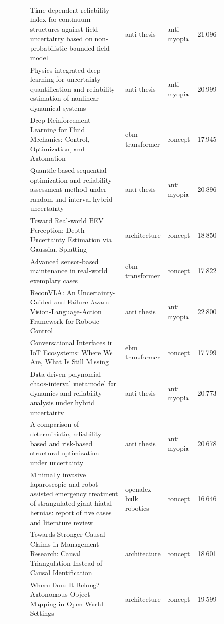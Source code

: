 \documentclass{article}
\begin{document}
\begin{center}
\begin{longtable}{p{0.12\linewidth}p{0.48\linewidth}p{0.14\linewidth}p{0.14\linewidth}r}
\citep{pool88_11} & Time-dependent reliability index for continuum structures against field uncertainty based on non-probabilistic bounded field model & anti thesis & anti myopia & 21.096\\
\citep{pool88_12} & Physics-integrated deep learning for uncertainty quantification and reliability estimation of nonlinear dynamical systems & anti thesis & anti myopia & 20.999\\
\citep{pool88_13} & Deep Reinforcement Learning for Fluid Mechanics: Control, Optimization, and Automation & ebm transformer & concept & 17.945\\
\citep{pool88_14} & Quantile-based sequential optimization and reliability assessment method under random and interval hybrid uncertainty & anti thesis & anti myopia & 20.896\\
\citep{pool88_15} & Toward Real-world BEV Perception: Depth Uncertainty Estimation via Gaussian Splatting & architecture & concept & 18.850\\
\citep{pool88_16} & Advanced sensor-based maintenance in real-world exemplary cases & ebm transformer & concept & 17.822\\
\citep{pool88_17} & ReconVLA: An Uncertainty-Guided and Failure-Aware Vision-Language-Action Framework for Robotic Control & anti thesis & anti myopia & 22.800\\
\citep{pool88_18} & Conversational Interfaces in IoT Ecosystems: Where We Are, What Is Still Missing & ebm transformer & concept & 17.799\\
\citep{pool88_19} & Data-driven polynomial chaos-interval metamodel for dynamics and reliability analysis under hybrid uncertainty & anti thesis & anti myopia & 20.773\\
\citep{pool88_20} & A comparison of deterministic, reliability-based and risk-based structural optimization under uncertainty & anti thesis & anti myopia & 20.678\\
\citep{pool88_21} & Minimally invasive laparoscopic and robot-assisted emergency treatment of strangulated giant hiatal hernias: report of five cases and literature review & openalex bulk robotics & concept & 16.646\\
\citep{pool88_22} & Towards Stronger Causal Claims in Management Research: Causal Triangulation Instead of Causal Identification & architecture & concept & 18.601\\
\citep{pool88_23} & Where Does It Belong? Autonomous Object Mapping in Open-World Settings & architecture & concept & 19.599\\

\end{longtable}
\end{center}
\end{document}
